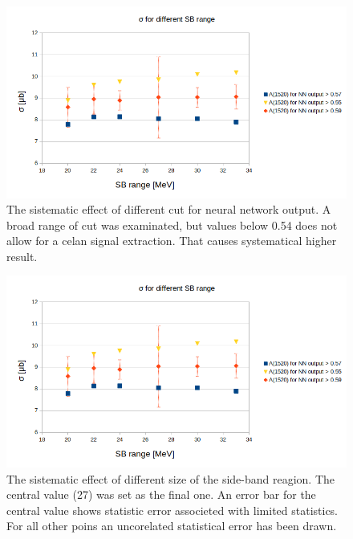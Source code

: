 \begin{figure}
  \centering
  \includegraphics[width=0.9\linewidth]{Chapter_analysis/systematics_SB.png}
  \caption{The sistematic effect of different cut for neural network output. A broad range of cut was examinated, but values below 0.54 does not allow for a celan signal extraction. That causes systematical higher result.}
  \label{fig:systematics_NN}
\end{figure}
\begin{figure}
  \centering
  \includegraphics[width=0.9\linewidth]{Chapter_analysis/systematics_SB.png}
  \caption{The sistematic effect of different size of the side-band reagion. The central value (27) was set as the final one. An error bar for the central value shows statistic error associeted with limited statistics. For all other poins an uncorelated statistical error has been drawn. }
  \label{fig:systematics_SB}
\end{figure}
